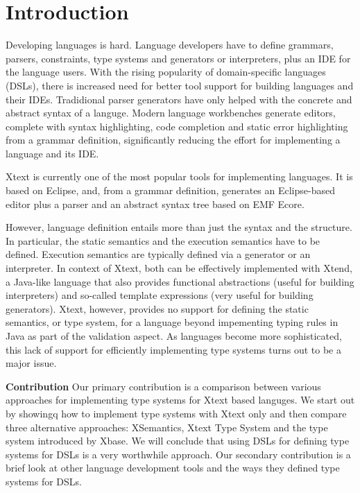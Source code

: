 \section{Introduction}
\label{sec:introduction}

Developing languages is hard. Language developers have to define grammars,
parsers, constraints, type systems and generators or interpreters, plus an IDE
for the language users. With the rising popularity of domain-specific languages
(DSLs), there is increased need for better tool support for building languages
and their IDEs. Tradidional parser generators have only helped with the concrete
and abstract syntax of a languge. Modern language workbenches generate editors,
complete with syntax highlighting, code completion and static error highlighting
from a grammar definition, significantly reducing the effort for implementing a
language and its IDE.

Xtext is currently one of the most popular tools for implementing languages. It
is based on Eclipse, and, from a grammar definition, generates an Eclipse-based
editor plus a parser and an abstract syntax tree based on EMF Ecore. 

However, language definition entails more than just the syntax and the
structure. In particular, the static semantics and the execution semantics have
to be defined. Execution semantics are typically defined via a generator or an
interpreter. In context of Xtext, both can be effectively implemented with
Xtend, a Java-like language that also provides functional abstractions (useful
for building interpreters) and so-called template expressions (very useful for
building generators). Xtext, however, provides no support for defining the
static semantics, or type system, for a language beyond impementing typing rules
in Java as part of the validation aspect. As languages become more
sophisticated, this lack of support for efficiently implementing type systems
turns out to be a major issue.


\textbf{Contribution} Our primary contribution is a comparison between various
approaches for implementing type systems for Xtext based languges. We start out
by showingq how to implement type systems with Xtext only and then compare three
alternative approaches: XSemantics, Xtext Type System and the type system introduced 
by Xbase. We will conclude that using DSLs for defining type systems for DSLs is
a very worthwhile approach. Our secondary contribution is a brief look
at other language development tools and the ways they defined type systems for
DSLs.

